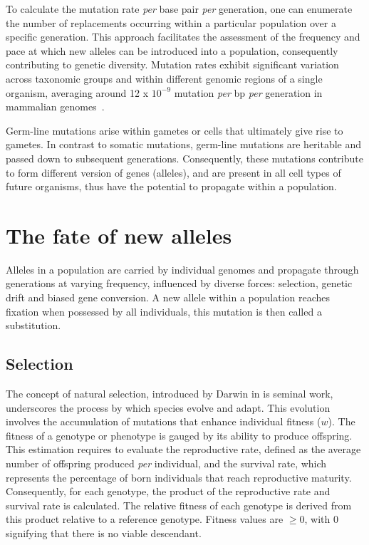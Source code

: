 To calculate the mutation rate \textit{per} base pair \textit{per} generation, one can enumerate the number of replacements occurring within a particular population over a specific generation. This approach facilitates the assessment of the frequency and pace at which new \gls{allele}s can be introduced into a population, consequently contributing to genetic diversity. Mutation rates exhibit significant variation across taxonomic groups and within different genomic regions of a single organism, averaging around 12 x $10^{-9}$ mutation \textit{per} \acrshort{bp} \textit{per} generation in mammalian genomes~\citep{kumar_mutation_2002, lynch_evolution_2010, bergeron_evolution_2023}.

Germ-line mutations arise within gametes or cells that ultimately give rise to gametes. In contrast to somatic mutations, germ-line mutations are heritable and passed down to subsequent generations. Consequently, these mutations contribute to form different version of genes (\gls{allele}s), and are present in all cell types of future organisms, thus have the potential to propagate within a population.

\section{The fate of new alleles}

Alleles in a population are carried by individual genomes and propagate through generations at varying frequency, influenced by diverse forces: selection, \gls{genetic drift} and \gls{biased gene conversion}. A new \gls{allele} within a population reaches fixation when possessed by all individuals, this mutation is then called a \gls{substitution}.


\subsection{Selection}
\label{selection}

The concept of natural selection, introduced by Darwin in is seminal work, underscores the process by which species evolve and adapt. This evolution involves the accumulation of mutations that enhance individual fitness ($w$). The fitness of a genotype or \gls{phenotype} is gauged by its ability to produce offspring. This estimation requires to evaluate the reproductive rate, defined as the average number of offspring produced \textit{per} individual, and the survival rate, which represents the percentage of born individuals that reach reproductive maturity. Consequently, for each genotype, the product of the reproductive rate and survival rate is calculated. The relative fitness of each genotype is derived from this product relative to a reference genotype. Fitness values are $\geq 0$, with 0 signifying that there is no viable descendant.

